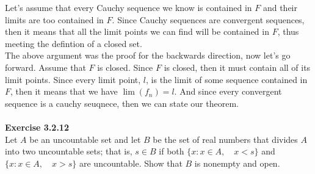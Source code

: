 Let's assume that every Cauchy sequence we know is contained in $F$ and their limits are too contained in $F$.
Since Cauchy sequences are convergent sequences, then it means that all the limit points we can find
will be contained in $F$, thus meeting the defintion of a closed set.
\\

The above argument was the proof for the backwards direction, now let's go forward.
Assume that $F$ is closed.
Since $F$ is closed, then it must contain all of its limit points.
Since every limit point, $l$, is the limit of some sequence contained in $F$, then it means that we have
$\lim (f_n) = l$.
And since every convergent sequence is a cauchy seuqnece, then we can state our theorem.
\\~\\



\textbf{Exercise 3.2.12}
\\

Let $A$ be an uncountable set and let $B$ be the set of real numbers that divides $A$ into two uncountable sets;
that is, $s \in B$ if both $\{ x : x \in A, \quad x < s \}$ and $\{ x : x \in A, \quad x > s\}$ are uncountable.
Show that $B$ is nonempty and open.
\\